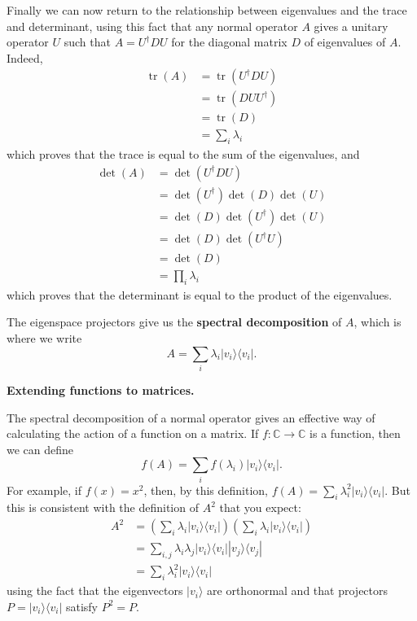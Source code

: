 \documentclass[fleqn,a4paper]{article}
\newenvironment{technical}[1]{\textbf{#1.}\par\vspace{.5\baselineskip}\everypar{\setlength{\parindent}{1.5em}}}{}
\theoremstyle{definition}
\theoremstyle{definition}
\theoremstyle{definition}
\theoremstyle{definition}
\theoremstyle{remark}
\begin{document}
Finally we can now return to the relationship between eigenvalues and the trace and determinant, using this fact that any normal operator \(A\) gives a unitary operator \(U\) such that \(A=U^\dagger DU\) for the diagonal matrix \(D\) of eigenvalues of \(A\).
Indeed,
\[
  \begin{aligned}
    \operatorname{tr}(A)
    &= \operatorname{tr}(U^\dagger DU)
  \\&= \operatorname{tr}(DUU^\dagger)
  \\&= \operatorname{tr}(D)
  \\&= \sum_i \lambda_i
  \end{aligned}
\]
which proves that the trace is equal to the sum of the eigenvalues, and
\[
  \begin{aligned}
    \det(A)
    &= \det(U^\dagger DU)
  \\&= \det(U^\dagger)\det(D)\det(U)
  \\&= \det(D)\det(U^\dagger)\det(U)
  \\&= \det(D)\det(U^\dagger U)
  \\&= \det(D)
  \\&= \prod_i \lambda_i
  \end{aligned}
\]
which proves that the determinant is equal to the product of the eigenvalues.

The eigenspace projectors give us the \textbf{spectral decomposition} of \(A\), which is where we write
\[
  A
  = \sum_i \lambda_i|v_i\rangle\langle v_i|.
\]

\begin{technical}{Extending functions to matrices}
The spectral decomposition of a normal operator gives an effective way of calculating the action of a function on a matrix.
If \(f\colon\mathbb{C}\to\mathbb{C}\) is a function, then we can define
\[
  f(A)
  = \sum_i f(\lambda_i)|v_i\rangle\langle v_i|.
\]
For example, if \(f(x)=x^2\), then, by this definition, \(f(A)=\sum_i \lambda_i^2|v_i\rangle\langle v_i|\).
But this is consistent with the definition of \(A^2\) that you expect:
\[
  \begin{aligned}
    A^2
    &= \left(\sum_i \lambda_i|v_i\rangle\langle v_i|\right)\left(\sum_i \lambda_i|v_i\rangle\langle v_i|\right)
  \\&= \sum_{i,j} \lambda_i\lambda_j |v_i\rangle\langle v_i||v_j\rangle\langle v_j|
  \\&= \sum_i \lambda_i^2 |v_i\rangle\langle v_i|
  \end{aligned}
\]
using the fact that the eigenvectors \(|v_i\rangle\) are orthonormal and that projectors \(P=|v_i\rangle\langle v_i|\) satisfy \(P^2=P\).

\end{technical}
\end{document}
